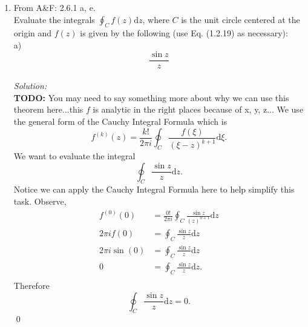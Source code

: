 \documentclass[10pt]{amsart}
\newcommand{\D}{\mathrm{d}}
\theoremstyle{nonumberplain}
\begin{document}
\begin{enumerate}[label={\bf {\arabic*}:}]
\item From A\&F: 2.6.1 a, e.\\
Evaluate the integrals $\oint_C f(z) \D z$, where $C$ is the unit circle centered at the origin and $f(z)$ is given by the following (use Eq. (1.2.19) as necessary): \\
a)
$$
\frac{\sin z}{z}
$$
\\
\textit{Solution:}\\
\textbf{TODO:} You may need to say something more about why we can use this theorem here...this $f$ is analytic in the right places because of x, y, z...
We use the general form of the Cauchy Integral Formula which is
$$
f^{(k)}(z) = \frac{k!}{2\pi i} \oint_C \frac{f(\xi)}{\left(\xi - z\right)^{k + 1}} \D \xi.
$$
We want to evaluate the integral 
$$
\oint_C \frac{\sin z}{z} \D z.
$$
Notice we can apply the Cauchy Integral Formula here to help simplify this task.
Observe,
\begin{align*}
f^{(0)}(0) &= \frac{0!}{2\pi i} \oint_C \frac{\sin z}{(z)^{0 + 1}} \D z \\
2\pi i f(0) &= \oint_C \frac{\sin z}{z} \D z \\
2\pi i \sin(0) &= \oint_C \frac{\sin z}{z} \D z \\
0 &= \oint_C \frac{\sin z}{z} \D z. \\
\end{align*}
Therefore 
$$
\oint_C \frac{\sin z}{z} \D z = 0.
$$
\qed
\\


\end{enumerate}
\end{document}
